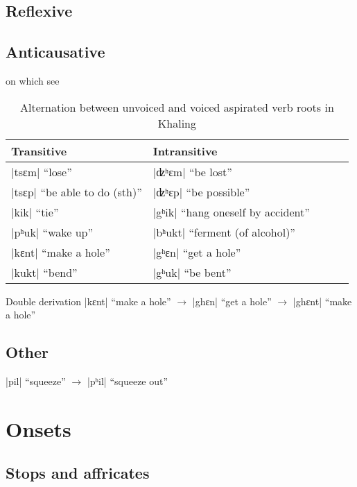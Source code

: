 \documentclass[oldfontcommands,oneside,a4paper,11pt]{article}
\newcommand{\ipa}[1]{{\phon\mbox{#1}}} %
\newcommand{\dhatu}[2]{|\ipa{#1}| ``#2''}
\begin{document}
\subsection{Reflexive}\label{sec:refl}

\subsection{Anticausative} \label{sec:anticaus}
\citet{jacques15derivational.khaling}

on which see \citealt{jacques15spontaneous, jacques15causative}

\begin{table}[H]
\caption{Alternation between unvoiced and voiced aspirated verb roots in Khaling} \centering \label{tab:anticaus}
\begin{tabular}{lllll}
\toprule
Transitive & Intransitive&  \\
\midrule
\dhatu{tsɛm}{lose} & \dhatu{ʣʰɛm}{be lost} \\
\dhatu{tsɛp}{be able to do (sth)} & \dhatu{ʣʰɛp}{be possible} \\
\dhatu{kik}{tie} & \dhatu{gʰik}{hang oneself by accident} \\
\dhatu{pʰuk}{wake up} & \dhatu{bʰukt}{ferment (of alcohol)} \\
\midrule
\dhatu{kɛnt}{make a hole} & \dhatu{gʰɛn}{get a hole} \\
\dhatu{kukt}{bend} & \dhatu{gʰuk}{be bent}\\
\bottomrule
\end{tabular}
\end{table}

Double derivation 
\dhatu{kɛnt}{make a hole} $\rightarrow$  \dhatu{ghɛn}{get a hole} $\rightarrow$  \dhatu{ghɛnt}{make a hole}

\subsection{Other}
\dhatu{pil}{squeeze} $\rightarrow$ \dhatu{pʰil}{squeeze out}

\section{Onsets} \label{sec:onsets}

\subsection{Stops and affricates} \label{sec:stops}
\end{document}
